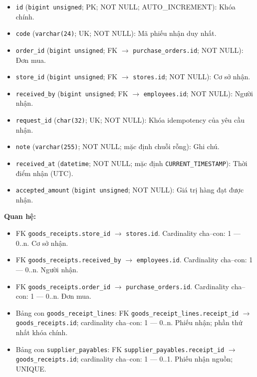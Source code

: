 \begin{itemize}

\item \texttt{id} (\texttt{bigint unsigned}; PK; NOT NULL; AUTO_INCREMENT): Khóa chính.

\item \texttt{code} (\texttt{varchar(24)}; UK; NOT NULL): Mã phiếu nhận duy nhất.

\item \texttt{order\_id} (\texttt{bigint unsigned}; FK $\rightarrow$ \texttt{purchase\_orders.id}; NOT NULL): Đơn mua.

\item \texttt{store\_id} (\texttt{bigint unsigned}; FK $\rightarrow$ \texttt{stores.id}; NOT NULL): Cơ sở nhận.

\item \texttt{received\_by} (\texttt{bigint unsigned}; FK $\rightarrow$ \texttt{employees.id}; NOT NULL): Người nhận.

\item \texttt{request\_id} (\texttt{char(32)}; UK; NOT NULL): Khóa idempotency của yêu cầu nhận.

\item \texttt{note} (\texttt{varchar(255)}; NOT NULL; mặc định chuỗi rỗng): Ghi chú.

\item \texttt{received\_at} (\texttt{datetime}; NOT NULL; mặc định \texttt{CURRENT\_TIMESTAMP}): Thời điểm nhận (UTC).

\item \texttt{accepted\_amount} (\texttt{bigint unsigned}; NOT NULL): Giá trị hàng đạt được nhận.

\end{itemize}

\textbf{Quan hệ:}

\begin{itemize}

\item FK \texttt{goods\_receipts.store\_id} $\rightarrow$ \texttt{stores.id}. Cardinality cha--con: 1 — 0..n. Cơ sở nhận.

\item FK \texttt{goods\_receipts.received\_by} $\rightarrow$ \texttt{employees.id}. Cardinality cha--con: 1 — 0..n. Người nhận.

\item FK \texttt{goods\_receipts.order\_id} $\rightarrow$ \texttt{purchase\_orders.id}. Cardinality cha--con: 1 — 0..n. Đơn mua.

\item Bảng con \texttt{goods\_receipt\_lines}: FK \texttt{goods\_receipt\_lines.receipt\_id} $\rightarrow$ \texttt{goods\_receipts.id}; cardinality cha--con: 1 — 0..n. Phiếu nhận; phần thứ nhất khóa chính.

\item Bảng con \texttt{supplier\_payables}: FK \texttt{supplier\_payables.receipt\_id} $\rightarrow$ \texttt{goods\_receipts.id}; cardinality cha--con: 1 — 0..1. Phiếu nhận nguồn; UNIQUE.

\end{itemize}

